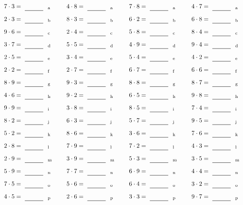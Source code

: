 \documentclass
[
  draft    = true,
  fontsize = 11pt,
  parskip  = half-
]
{scrartcl}
\begin{document}
\par\vfill\par
\begin{align*}
    \pline{7\cdot3}&=\rline{a}
  & \pline{4\cdot8}&=\rline{a}
  & \pline{7\cdot8}&=\rline{a}
  & \pline{4\cdot7}&=\rline{a} \\[1ex]
    \pline{2\cdot3}&=\rline{b}
  & \pline{8\cdot3}&=\rline{b}
  & \pline{6\cdot2}&=\rline{b}
  & \pline{6\cdot8}&=\rline{b} \\[1ex]
    \pline{9\cdot6}&=\rline{c}
  & \pline{2\cdot4}&=\rline{c}
  & \pline{5\cdot8}&=\rline{c}
  & \pline{8\cdot4}&=\rline{c} \\[1ex]
    \pline{3\cdot7}&=\rline{d}
  & \pline{5\cdot5}&=\rline{d}
  & \pline{4\cdot9}&=\rline{d}
  & \pline{9\cdot4}&=\rline{d} \\[1ex]
    \pline{2\cdot5}&=\rline{e}
  & \pline{3\cdot4}&=\rline{e}
  & \pline{5\cdot4}&=\rline{e}
  & \pline{4\cdot2}&=\rline{e} \\[1ex]
    \pline{2\cdot2}&=\rline{f}
  & \pline{2\cdot7}&=\rline{f}
  & \pline{6\cdot7}&=\rline{f}
  & \pline{6\cdot6}&=\rline{f} \\[1ex]
    \pline{8\cdot9}&=\rline{g}
  & \pline{9\cdot3}&=\rline{g}
  & \pline{8\cdot8}&=\rline{g}
  & \pline{8\cdot7}&=\rline{g} \\[1ex]
    \pline{4\cdot6}&=\rline{h}
  & \pline{9\cdot2}&=\rline{h}
  & \pline{6\cdot5}&=\rline{h}
  & \pline{9\cdot8}&=\rline{h} \\[1ex]
    \pline{9\cdot9}&=\rline{i}
  & \pline{3\cdot8}&=\rline{i}
  & \pline{8\cdot5}&=\rline{i}
  & \pline{7\cdot4}&=\rline{i} \\[1ex]
    \pline{8\cdot2}&=\rline{j}
  & \pline{6\cdot3}&=\rline{j}
  & \pline{5\cdot7}&=\rline{j}
  & \pline{9\cdot5}&=\rline{j} \\[1ex]
    \pline{5\cdot2}&=\rline{k}
  & \pline{8\cdot6}&=\rline{k}
  & \pline{3\cdot6}&=\rline{k}
  & \pline{7\cdot6}&=\rline{k} \\[1ex]
    \pline{2\cdot8}&=\rline{l}
  & \pline{7\cdot9}&=\rline{l}
  & \pline{7\cdot2}&=\rline{l}
  & \pline{4\cdot3}&=\rline{l} \\[1ex]
    \pline{2\cdot9}&=\rline{m}
  & \pline{3\cdot9}&=\rline{m}
  & \pline{5\cdot3}&=\rline{m}
  & \pline{3\cdot5}&=\rline{m} \\[1ex]
    \pline{5\cdot9}&=\rline{n}
  & \pline{7\cdot7}&=\rline{n}
  & \pline{6\cdot9}&=\rline{n}
  & \pline{4\cdot4}&=\rline{n} \\[1ex]
    \pline{7\cdot5}&=\rline{o}
  & \pline{5\cdot6}&=\rline{o}
  & \pline{6\cdot4}&=\rline{o}
  & \pline{3\cdot2}&=\rline{o} \\[1ex]
    \pline{4\cdot5}&=\rline{p}
  & \pline{2\cdot6}&=\rline{p}
  & \pline{3\cdot3}&=\rline{p}
  & \pline{9\cdot7}&=\rline{p}
\end{align*}
\end{document}
